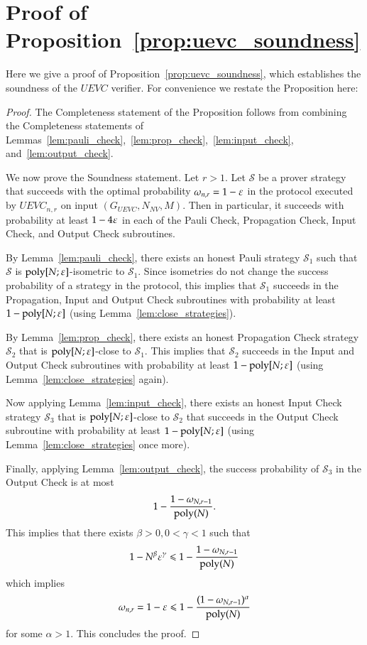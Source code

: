 \section{Proof of Proposition~\ref{prop:uevc_soundness}}
\label{sec:soundness}

Here we give a proof of Proposition~\ref{prop:uevc_soundness}, which establishes the soundness of the $UEVC$ verifier. For convenience we restate the Proposition here:

\soundness*

\begin{proof}
	
	The Completeness statement of the Proposition follows from combining the Completeness statements of Lemmas~\ref{lem:pauli_check},~\ref{lem:prop_check},~\ref{lem:input_check}, and~\ref{lem:output_check}.
	
	We now prove the Soundness statement. Let $r > 1$. Let $\mathcal{S}$ be a prover strategy that succeeds with the optimal probability $\omega_{n,r} = 1 - \varepsilon$ in the protocol executed by $UEVC_{n,r}$ on input $(G_{UEVC},N_{NV},M)$. Then in particular, it succeeds with probability at least $1 - 4\varepsilon$ in each of the Pauli Check, Propagation Check, Input Check, and Output Check subroutines. 
	
	By Lemma~\ref{lem:pauli_check}, there exists an honest Pauli strategy $\mathcal{S}_1$ such that $\mathcal{S}$ is $\operatorname{poly}[N;\varepsilon]$-isometric to $\mathcal{S}_1$. Since isometries do not change the success probability of a strategy in the protocol, this implies that $\mathcal{S}_1$ succeeds in the Propagation, Input and Output Check subroutines with probability at least $1 - \operatorname{poly}[N;\varepsilon]$ (using Lemma~\ref{lem:close_strategies}).
	
	By Lemma~\ref{lem:prop_check}, there exists an honest Propagation Check strategy $\mathcal{S}_2$ that is $\operatorname{poly}[N;\varepsilon]$-close to $\mathcal{S}_1$. This implies that $\mathcal{S}_2$ succeeds in the Input and Output Check subroutines with probability at least $1 - \operatorname{poly}[N;\varepsilon]$ (using Lemma~\ref{lem:close_strategies} again).
	
	Now applying Lemma~\ref{lem:input_check}, there exists an honest Input Check strategy $\mathcal{S}_3$ that is $\operatorname{poly}[N;\varepsilon]$-close to $\mathcal{S}_2$ that succeeds in the Output Check subroutine with probability at least $1 - \operatorname{poly}[N;\varepsilon]$ (using Lemma~\ref{lem:close_strategies} once more).
	
	Finally, applying Lemma~\ref{lem:output_check}, the success probability of $\mathcal{S}_3$ in the Output Check is at most 
	\[
		1 - \frac{1 - \omega_{N,r-1}}{\operatorname{poly}(N)}.
	\]
	This implies that there exists $\beta > 0, 0 < \gamma < 1$ such that
	\[
		1 - N^\beta \varepsilon^\gamma \leqslant 1 - \frac{1 - \omega_{N,r-1}}{\operatorname{poly}(N)}
	\]
	which implies
	\[
		\omega_{n,r} = 1 - \varepsilon \leqslant 1 - \frac{(1 - \omega_{N,r-1})^\alpha}{\operatorname{poly}(N)}
	\]
	for some $\alpha > 1$. 
	This concludes the proof.
\end{proof}